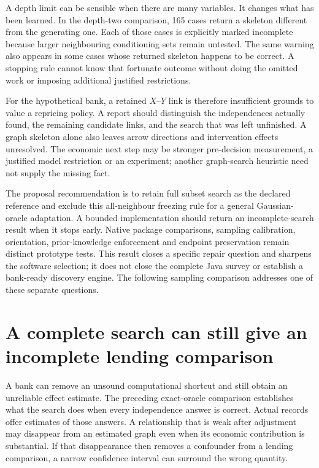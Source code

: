 A depth limit can be sensible when there are many variables. It changes
what has been learned. In the depth-two comparison, 165 cases return a
skeleton different from the generating one. Each of those cases is explicitly
marked incomplete because larger neighbouring conditioning sets remain
untested. The same warning also appears in some cases whose returned
skeleton happens to be correct. A stopping rule cannot know that fortunate
outcome without doing the omitted work or imposing additional justified
restrictions.

For the hypothetical bank, a retained $X$--$Y$ link is therefore insufficient
grounds to value a repricing policy. A report should distinguish the
independences actually found, the remaining candidate links, and the
search that was left unfinished. A graph skeleton alone also leaves arrow
directions and intervention effects unresolved. The economic next step may
be stronger pre-decision measurement, a justified model restriction or an
experiment; another graph-search heuristic need not supply the missing fact.

The proposal recommendation is to retain full subset search as the declared
reference and exclude this all-neighbour freezing rule for a general
Gaussian-oracle adaptation. A bounded implementation should return an
incomplete-search result when it stops early. Native package comparisons,
sampling calibration, orientation, prior-knowledge enforcement and endpoint
preservation remain distinct prototype tests. This result closes a specific
repair question and sharpens the software selection; it does not close the
complete Java survey or establish a bank-ready discovery engine. The following sampling comparison addresses one of these separate questions.

\section{A complete search can still give an incomplete lending comparison}
\label{closure30:sampling}

A bank can remove an unsound computational shortcut and still obtain an
unreliable effect estimate. The preceding exact-oracle comparison establishes
what the search does when every independence answer is correct. Actual records
offer estimates of those answers. A relationship that is weak after adjustment
may disappear from an estimated graph even when its economic contribution is
substantial. If that disappearance then removes a confounder from a lending
comparison, a narrow confidence interval can surround the wrong quantity.


